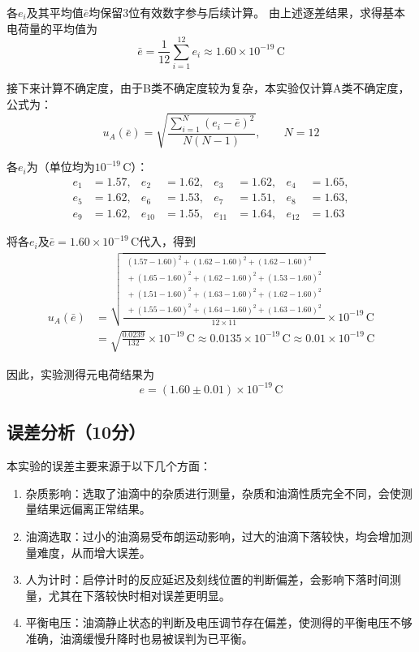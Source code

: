 \documentclass[10pt,a4paper]{ctexart} %
\begin{document}
  各$e_i$及其平均值$\bar e$均保留3位有效数字参与后续计算。
  由上述逐差结果，求得基本电荷量的平均值为
  \[
    \bar e=\frac{1}{12}\sum_{i=1}^{12}e_i
    \approx1.60\times10^{-19}\,\mathrm{C}
  \]

  接下来计算不确定度，由于B类不确定度较为复杂，本实验仅计算A类不确定度，公式为：
  \[
    u_A(\bar e)=\sqrt{\frac{\displaystyle\sum_{i=1}^{N}(e_i-\bar e)^2}{N(N-1)}},
    \qquad N=12
  \]

  各$e_i$为（单位均为$10^{-19}\,\mathrm{C}$）：
  \[
    \begin{aligned}
      e_1&=1.57, & e_2&=1.62, & e_3&=1.62, & e_4&=1.65,\\
      e_5&=1.62, & e_6&=1.53, & e_7&=1.51, & e_8&=1.63,\\
      e_9&=1.62, & e_{10}&=1.55, & e_{11}&=1.64, & e_{12}&=1.63
    \end{aligned}
  \]
  
  将各$e_i$及$\bar e=1.60\times10^{-19}\,\mathrm{C}$代入，得到
  \[
    \begin{aligned}
      u_A(\bar e)
      &=\sqrt{\frac{\begin{gathered}
          (1.57-1.60)^2+(1.62-1.60)^2+(1.62-1.60)^2\\
          {}+(1.65-1.60)^2+(1.62-1.60)^2+(1.53-1.60)^2\\
          {}+(1.51-1.60)^2+(1.63-1.60)^2+(1.62-1.60)^2\\
          {}+(1.55-1.60)^2+(1.64-1.60)^2+(1.63-1.60)^2
        \end{gathered}}{12\times11}}\times10^{-19}\,\mathrm{C}\\[0.5em]
      &=\sqrt{\frac{0.0239}{132}}\times10^{-19}\,\mathrm{C}
      \approx0.0135\times10^{-19}\,\mathrm{C}
      \approx0.01\times10^{-19}\,\mathrm{C}
    \end{aligned}
  \]
  
  因此，实验测得元电荷结果为
  \[
    \boxed{e=(1.60\pm0.01)\times10^{-19}\,\mathrm{C}}
  \]

  \subsection{误差分析（10分）}
  本实验的误差主要来源于以下几个方面：
  \begin{enumerate}
    \item 杂质影响：选取了油滴中的杂质进行测量，杂质和油滴性质完全不同，会使测量结果远偏离正常结果。
    \item 油滴选取：过小的油滴易受布朗运动影响，过大的油滴下落较快，均会增加测量难度，从而增大误差。
    \item 人为计时：启停计时的反应延迟及刻线位置的判断偏差，会影响下落时间测量，尤其在下落较快时相对误差更明显。
    \item 平衡电压：油滴静止状态的判断及电压调节存在偏差，使测得的平衡电压不够准确，油滴缓慢升降时也易被误判为已平衡。
  \end{enumerate}
\end{document}
